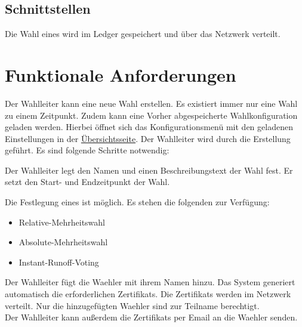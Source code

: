 \documentclass[parskip=full,11pt,twoside]{scrartcl}
\begin{document}
\subsection{Schnittstellen}
Die \gls{Wahl} eines  wird im \gls{Ledger} gespeichert und über das Netzwerk verteilt.

\section{Funktionale Anforderungen}

Der \gls{Wahlleiter} kann eine neue \gls{Wahl} erstellen. Es existiert immer nur eine \gls{Wahl} zu einem Zeitpunkt.
Zudem kann eine Vorher abgespeicherte Wahlkonfiguration geladen werden. Hierbei öffnet sich das Konfigurationsmenü mit den geladenen Einstellungen in der \hyperref[fig:wlltr-done]{Übersichtsseite}.
Der \gls{Wahlleiter} wird durch die Erstellung geführt. Es sind folgende Schritte notwendig:

Der \gls{Wahlleiter} legt den Namen und einen Beschreibungstext der \gls{Wahl} fest.
Er setzt den Start- und Endzeitpunkt der Wahl.

Die Festlegung eines  ist möglich. Es stehen die folgenden zur Verfügung:
\begin{itemize}
	\item \gls{Relative-Mehrheitswahl}
	\item \gls{Absolute-Mehrheitswahl}
	\item \gls{Instant-Runoff-Voting}
\end{itemize}

Der \gls{Wahlleiter} fügt die \gls{Waehler} mit ihrem Namen hinzu. Das System generiert automatisch die erforderlichen \glspl{Zertifikat}. Die \glspl{Zertifikat} werden im Netzwerk verteilt. Nur die hinzugefügten \gls{Waehler} sind zur Teilname berechtigt. \\
Der \gls{Wahlleiter} kann außerdem die \glspl{Zertifikat} per Email an die \gls{Waehler} senden. %
\end{document}
